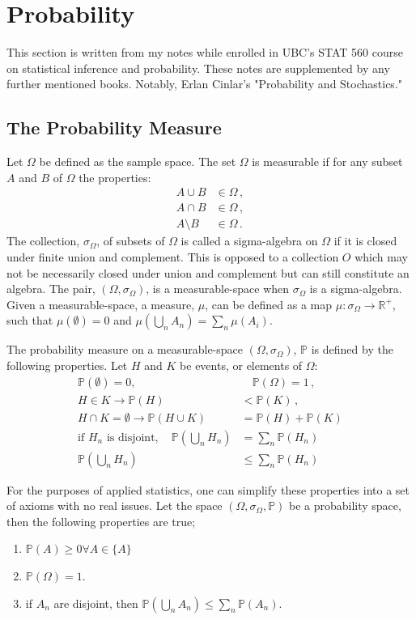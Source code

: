 \chapter{Probability}

This section is written from my notes while enrolled in UBC's STAT 560 course on statistical inference and probability. These notes are supplemented by any further mentioned books. Notably, Erlan Cinlar's "Probability and Stochastics."

\section{The Probability Measure}

Let $\Omega$ be defined as the sample space. The set $\Omega$ is measurable if for any subset $A$ and $B$ of $\Omega$ the properties:
\begin{align*}
	A\cup B &\in \Omega\,, \\
	A\cap B &\in \Omega\,, \\
	A \setminus B &\in \Omega\,.
\end{align*} 
The collection, $\sigma_\Omega$, of subsets of $\Omega$ is called a sigma-algebra on $\Omega$ if it is closed under finite union and complement. This is opposed to a collection $O$ which may not be necessarily closed under union and complement but can still constitute an algebra. The pair, $(\Omega, \sigma_\Omega)$, is a measurable-space when $\sigma_\Omega$ is a sigma-algebra. Given a measurable-space, a measure, $\mu$, can be defined as a map $\mu: \sigma_\Omega \rightarrow \mathbb{R}^+$, such that $\mu(\emptyset) = 0$ and $\mu(\bigcup_n A_n) = \sum_{n}\mu(A_i)$.

\begin{definition}
	The probability measure on a measurable-space $(\Omega, \sigma_\Omega)$, $\mathbb{P}$ is defined by the following properties. Let $H$ and $K$ be events, or elements of $\Omega$:
	\begin{align}
		\mathbb{P}(\emptyset) = 0,&\quad \mathbb{P}(\Omega) = 1\,,\\
		H \in K \rightarrow \mathbb{P}(H) &< \mathbb{P}(K)\,,\\
		H \cap K = \emptyset \rightarrow \mathbb{P}(H \cup K) &= \mathbb{P}(H) + \mathbb{P}(K)\\
		\text{if }H_n\text{ is disjoint}, \quad \mathbb{P}(\bigcup_n H_n) &= \sum_n \mathbb{P}(H_n)\\
		\mathbb{P}(\bigcup_n H_n) &\leq \sum_n \mathbb{P}(H_n)
	\end{align}
\end{definition}
For the purposes of applied statistics, one can simplify these properties into a set of axioms with no real issues. Let the space $(\Omega, \sigma_\Omega, \mathbb{P})$ be a probability space, then the following properties are true;
\begin{enumerate}
	\item $\mathbb{P}(A) \geq 0 \forall A \in \{A\}$
	\item $\mathbb{P}(\Omega) = 1$.
	\item if $A_n$ are disjoint, then $\mathbb{P}(\bigcup_n A_n) \leq \sum_n \mathbb{P}(A_n)$.
\end{enumerate}


